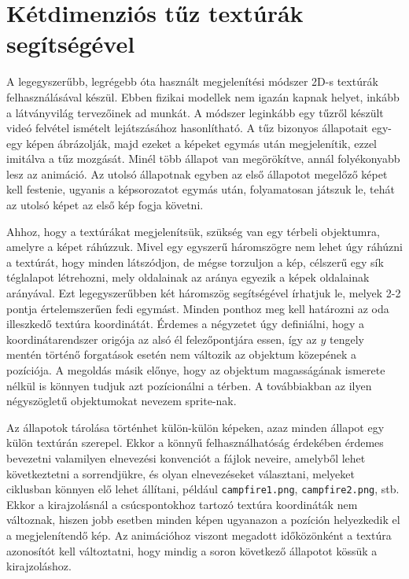 

\section{Kétdimenziós tűz textúrák segítségével}

A legegyszerűbb, legrégebb óta használt megjelenítési módszer 2D-s textúrák felhasználásával készül. Ebben fizikai modellek nem igazán kapnak helyet, inkább a látványvilág tervezőinek ad munkát. A módszer leginkább egy tűzről készült videó felvétel ismételt lejátszásához hasonlítható. A tűz bizonyos állapotait egy-egy képen ábrázolják, majd ezeket a képeket egymás után megjelenítik, ezzel imitálva a tűz mozgását. Minél több állapot van megörökítve, annál folyékonyabb lesz az animáció. Az utolsó állapotnak egyben az első állapotot megelőző képet kell festenie, ugyanis a képsorozatot egymás után, folyamatosan játszuk le, tehát az utolsó képet az első kép fogja követni.

Ahhoz, hogy a textúrákat megjelenítsük, szükség van egy térbeli objektumra, amelyre a képet ráhúzzuk. Mivel egy egyszerű háromszögre nem lehet úgy ráhúzni a textúrát, hogy minden látszódjon, de mégse torzuljon a kép, célszerű egy sík téglalapot létrehozni, mely oldalainak az aránya egyezik a képek oldalainak arányával. Ezt legegyszerűbben két háromszög segítségével írhatjuk le, melyek 2-2 pontja értelemszerűen fedi egymást. Minden ponthoz meg kell határozni az oda illeszkedő textúra koordinátát. Érdemes a négyzetet úgy definiálni, hogy a koordinátarendszer origója az alsó él felezőpontjára essen, így az $y$ tengely mentén történő forgatások esetén nem változik az objektum közepének a pozíciója. A megoldás másik előnye, hogy az objektum magasságának ismerete nélkül is könnyen tudjuk azt pozícionálni a térben. A továbbiakban az ilyen négyszögletű objektumokat nevezem sprite-nak.

Az állapotok tárolása történhet külön-külön képeken, azaz minden állapot egy külön textúrán szerepel. Ekkor a könnyű felhasználhatóság érdekében érdemes bevezetni valamilyen elnevezési konvenciót a fájlok neveire, amelyből lehet következtetni a sorrendjükre, és olyan elnevezéseket választani, melyeket ciklusban könnyen elő lehet állítani, például \texttt{campfire1.png}, \texttt{campfire2.png}, stb. Ekkor a kirajzolásnál a csúcspontokhoz tartozó textúra koordináták nem változnak, hiszen jobb esetben minden képen ugyanazon a pozíción helyezkedik el a megjelenítendő kép. Az animációhoz viszont megadott időközönként a textúra azonosítót kell változtatni, hogy mindig a soron következő állapotot kössük a kirajzoláshoz.

